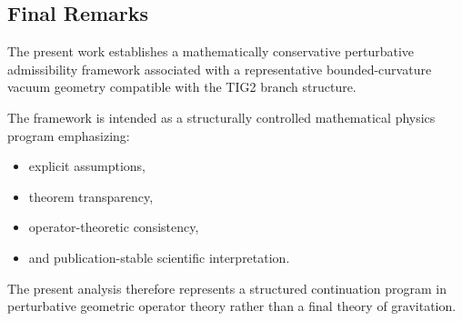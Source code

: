 
\subsection{Final Remarks}

The present work establishes a mathematically conservative perturbative admissibility framework associated with a representative bounded-curvature vacuum geometry compatible with the TIG2 branch structure.

The framework is intended as a structurally controlled mathematical physics program emphasizing:
\begin{itemize}[leftmargin=0.6cm]
\item explicit assumptions,
\item theorem transparency,
\item operator-theoretic consistency,
\item and publication-stable scientific interpretation.
\end{itemize}

The present analysis therefore represents a structured continuation program in perturbative geometric operator theory rather than a final theory of gravitation.
